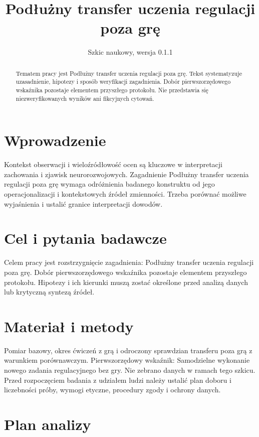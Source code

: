\documentclass[11pt,a4paper]{article}
\title{Podłużny transfer uczenia regulacji poza grę}
\author{}
\date{Szkic naukowy, wersja 0.1.1}
\begin{document}
\maketitle

\begin{abstract}

Tematem pracy jest Podłużny transfer uczenia regulacji poza grę. Tekst systematyzuje uzasadnienie, hipotezy i sposób weryfikacji zagadnienia. Dobór pierwszorzędowego wskaźnika pozostaje elementem przyszłego protokołu. Nie przedstawia się niezweryfikowanych wyników ani fikcyjnych cytowań.

\end{abstract}

\section{Wprowadzenie}

Kontekst obserwacji i wieloźródłowość ocen są kluczowe w interpretacji zachowania i zjawisk neurorozwojowych. Zagadnienie Podłużny transfer uczenia regulacji poza grę wymaga odróżnienia badanego konstruktu od jego operacjonalizacji i kontekstowych źródeł zmienności. Trzeba porównać możliwe wyjaśnienia i ustalić granice interpretacji dowodów.

\section{Cel i pytania badawcze}

Celem pracy jest rozstrzygnięcie zagadnienia: Podłużny transfer uczenia regulacji poza grę. Dobór pierwszorzędowego wskaźnika pozostaje elementem przyszłego protokołu. Hipotezy i ich kierunki muszą zostać określone przed analizą danych lub krytyczną syntezą źródeł.

\section{Materiał i metody}

Pomiar bazowy, okres ćwiczeń z grą i odroczony sprawdzian transferu poza grą z warunkiem porównawczym. Pierwszorzędowy wskaźnik: Samodzielne wykonanie nowego zadania regulacyjnego bez gry. Nie zebrano danych w ramach tego szkicu. Przed rozpoczęciem badania z udziałem ludzi należy ustalić plan doboru i liczebności próby, wymogi etyczne, procedury zgody i ochrony danych.

\section{Plan analizy}
\end{document}
